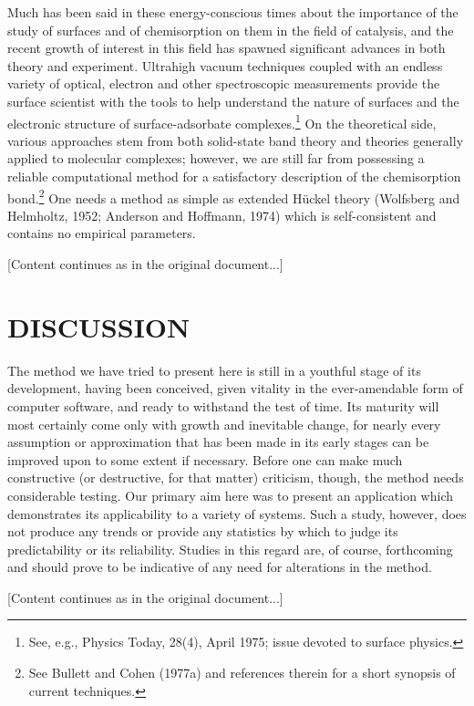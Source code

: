 \documentclass[12pt,letterpaper]{report}
\begin{document}
Much has been said in these energy-conscious times about the importance of the study of surfaces and of chemisorption on them in the field of catalysis, and the recent growth of interest in this field has spawned significant advances in both theory and experiment. Ultrahigh vacuum techniques coupled with an endless variety of optical, electron and other spectroscopic measurements provide the surface scientist with the tools to help understand the nature of surfaces and the electronic structure of surface-adsorbate complexes.\footnote{See, e.g., Physics Today, 28(4), April 1975; issue devoted to surface physics.} On the theoretical side, various approaches stem from both solid-state band theory and theories generally applied to molecular complexes; however, we are still far from possessing a reliable computational method for a satisfactory description of the chemisorption bond.\footnote{See Bullett and Cohen (1977a) and references therein for a short synopsis of current techniques.} One needs a method as simple as extended Hückel theory (Wolfsberg and Helmholtz, 1952; Anderson and Hoffmann, 1974) which is self-consistent and contains no empirical parameters.

[Content continues as in the original document...]

\chapter{DISCUSSION}

The method we have tried to present here is still in a youthful stage of its development, having been conceived, given vitality in the ever-amendable form of computer software, and ready to withstand the test of time. Its maturity will most certainly come only with growth and inevitable change, for nearly every assumption or approximation that has been made in its early stages can be improved upon to some extent if necessary. Before one can make much constructive (or destructive, for that matter) criticism, though, the method needs considerable testing. Our primary aim here was to present an application which demonstrates its applicability to a variety of systems. Such a study, however, does not produce any trends or provide any statistics by which to judge its predictability or its reliability. Studies in this regard are, of course, forthcoming and should prove to be indicative of any need for alterations in the method.

[Content continues as in the original document...]
\end{document}
